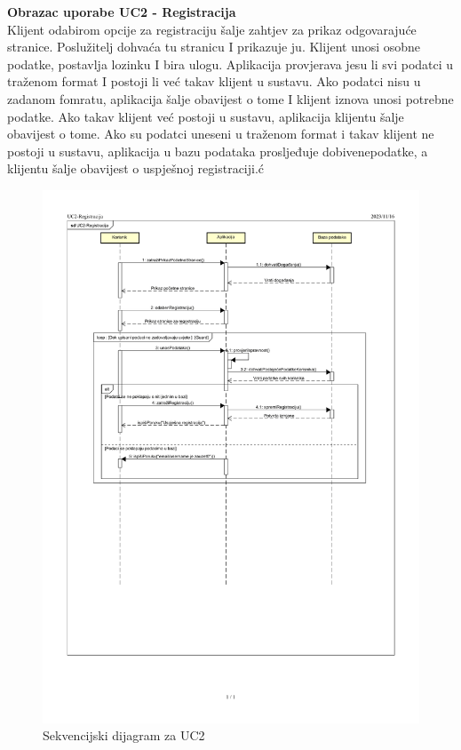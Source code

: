 				
				\textbf{\large Obrazac uporabe UC2 - Registracija}\\
				
				
				Klijent odabirom opcije za registraciju šalje zahtjev za prikaz odgovarajuće stranice. Poslužitelj dohvaća tu stranicu I prikazuje ju. Klijent unosi osobne podatke, postavlja lozinku I bira ulogu. Aplikacija provjerava jesu li svi podatci u traženom format I postoji li već takav klijent u sustavu. Ako podatci nisu u zadanom fomratu, aplikacija šalje obavijest o tome I klijent iznova unosi potrebne podatke. Ako takav klijent već postoji u sustavu, aplikacija klijentu šalje obavijest o tome. Ako su podatci uneseni u traženom format i takav klijent ne postoji u sustavu, aplikacija u bazu podataka prosljeđuje dobivenepodatke, a klijentu šalje obavijest o uspješnoj registraciji.ć
				\begin{figure}[H]
						\includegraphics[scale=0.7]{slike/uc2-1.PNG} %
						\centering
						\caption{Sekvencijski dijagram za UC2}
						\label{fig:promjene}
				\end{figure}
				

